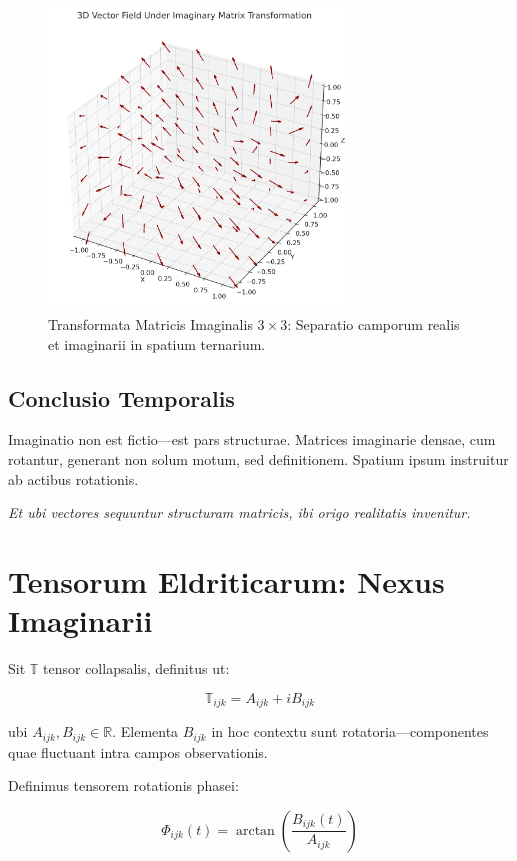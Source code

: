 \begin{figure}[H]
  \centering
  \includegraphics[width=0.7\textwidth]{images/output(3).png}
  \caption{Transformata Matricis Imaginalis \(3 \times 3\): Separatio camporum realis et imaginarii in spatium ternarium.}
\end{figure}

\subsection*{Conclusio Temporalis}

Imaginatio non est fictio—est pars structurae. Matrices imaginarie densae, cum rotantur, generant non solum motum, sed definitionem. Spatium ipsum instruitur ab actibus rotationis.

\textit{Et ubi vectores sequuntur structuram matricis, ibi origo realitatis invenitur.}

\section*{Tensorum Eldriticarum: Nexus Imaginarii}

Sit \( \mathbb{T} \) tensor collapsalis, definitus ut:

\[
\mathbb{T}_{ijk} = A_{ijk} + i B_{ijk}
\]

ubi \( A_{ijk}, B_{ijk} \in \mathbb{R} \). Elementa \( B_{ijk} \) in hoc contextu sunt rotatoria—componentes quae fluctuant intra campos observationis.

Definimus tensorem rotationis phasei:

\[
\Phi_{ijk}(t) = \arctan\left( \frac{B_{ijk}(t)}{A_{ijk}} \right)
\]

